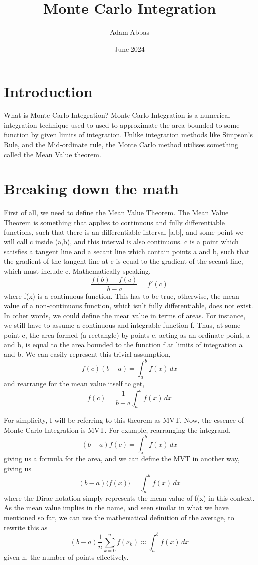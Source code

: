\documentclass{article}
\title{Monte Carlo Integration}
\author{Adam Abbas}
\date{June 2024}
\begin{document}
\maketitle

\section{Introduction}
What is Monte Carlo Integration? Monte Carlo Integration is a numerical integration technique used to used to approximate the area bounded to some function by given limits of integration. Unlike integration methods like Simpson's Rule, and the Mid-ordinate rule, the Monte Carlo method utilises
something called the Mean Value theorem. 

\section{Breaking down the math}
First of all, we need to define the Mean Value Theorem. The Mean Value Theorem is something that 
applies to continuous and fully differentiable functions, such that there is an differentiable interval [a,b], and some point we will call c inside (a,b), and this interval is also continuous.
c is a point which satisfies a tangent line and a secant line which contain points a and b, such that the gradient of the tangent line at c is equal to the gradient of the secant line, which must include c. Mathematically speaking, 
$$\frac{f(b) - f(a)}{b-a} = f'(c)$$
where f(x) is a continuous function. This has to be true, otherwise, the mean value of a non-continuous function, which isn't fully differentiable, does not exist.
In other words, we could define the mean value in terms of areas. For instance, we still have to assume a continuous and integrable function f. Thus, at some point c, the area formed (a rectangle) by points c, acting as an ordinate point, a and b, is equal to the area bounded to the function f at limits of integration a and b. We can easily represent this trivial assumption,
$$ f(c)(b-a) = \int_{a}^{b}{f(x) \, dx}$$
and rearrange for the mean value itself to get,
$$f(c) = \frac{1}{b-a} \int_{a}^{b}{f(x) \, dx}$$

For simplicity, I will be referring to this theorem as MVT. Now, the essence of Monte Carlo Integration is MVT. For example, rearranging the integrand,
$$(b-a)f(c) = \int_{a}^{b}{f(x) \, dx}$$
giving us a formula for the area, and we can define the MVT in another way, giving us
$$(b-a)\langle f(x) \rangle = \int_{a}^{b}{f(x)} \, dx$$
where the Dirac notation simply represents the mean value of f(x) in this context. As the mean value implies in the name, and seen similar in what we have mentioned so far, we can use the mathematical definition of the average, to rewrite this as 
$$(b-a)\frac{1}{n}\sum_{k=0}^{n}{f(x_k)} \approx \int_{a}^{b}{f(x)} \, dx$$
given n, the number of points effectively. 
\end{document}
